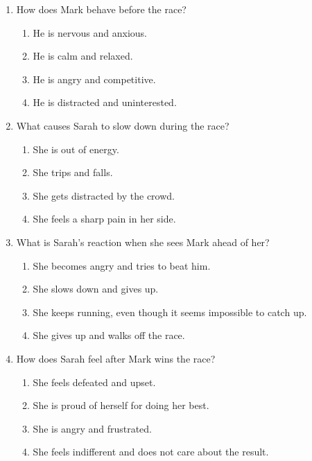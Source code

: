\documentclass[12pt]{article}
\begin{document}
\begin{enumerate}
\vspace{0.5cm}

\item How does Mark behave before the race?
\begin{enumerate}[label=\Alph*.]
    \item He is nervous and anxious.
    \item He is calm and relaxed.
    \item He is angry and competitive.
    \item He is distracted and uninterested.
\end{enumerate}

\vspace{0.5cm}

\item What causes Sarah to slow down during the race?
\begin{enumerate}[label=\Alph*.]
    \item She is out of energy.
    \item She trips and falls.
    \item She gets distracted by the crowd.
    \item She feels a sharp pain in her side.
\end{enumerate}

\vspace{0.5cm}

\item What is Sarah's reaction when she sees Mark ahead of her?
\begin{enumerate}[label=\Alph*.]
    \item She becomes angry and tries to beat him.
    \item She slows down and gives up.
    \item She keeps running, even though it seems impossible to catch up.
    \item She gives up and walks off the race.
\end{enumerate}

\vspace{0.5cm}

\item How does Sarah feel after Mark wins the race?
\begin{enumerate}[label=\Alph*.]
    \item She feels defeated and upset.
    \item She is proud of herself for doing her best.
    \item She is angry and frustrated.
    \item She feels indifferent and does not care about the result.
\end{enumerate}


\end{enumerate}
\end{document}
